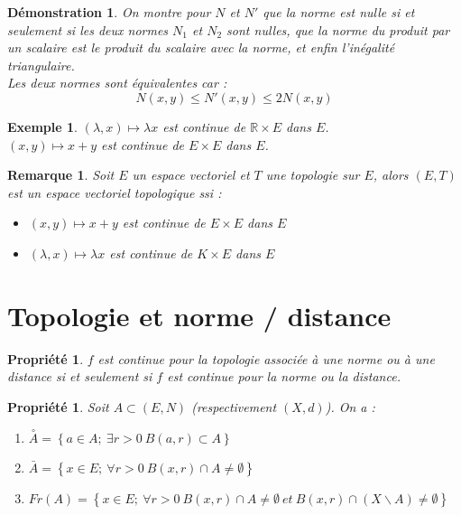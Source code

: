 \documentclass[a4paper, oneside]{report}
\theoremstyle{break}
\newtheorem{propr}[thm]{Propriété}
\newtheorem{exem}[thm]{Exemple}
\newtheorem*{demo}{Démonstration}
\newtheorem{remar}[thm]{Remarque}
\newcommand{\x}{\times}
\newcommand{\R}{\mathbb{R}}
\newcommand{\ev}{espace vectoriel }
\newcommand{\cerc}[1]{\overset{\circ}{#1}}
\begin{document}
\begin{demo}
On montre pour $N$ et $N'$ que la norme est nulle si et seulement si les deux normes $N_1$ et $N_2$ sont nulles, que la norme du produit par un scalaire est le produit du scalaire avec la norme, et enfin l'inégalité triangulaire.\\
Les deux normes sont équivalentes car :
$$N(x,y) \leq N'(x,y) \leq 2N(x,y)$$
\end{demo}



\begin{exem}
$(\lambda , x)\mapsto \lambda x$ est continue de $\R \x E$ dans $E$.\\
$(x , y)\mapsto x+y$ est continue de $E \x E$ dans $E$.\\
\end{exem}


\begin{remar}
Soit $E$ un \ev et $T$ une topologie sur $E$, alors $(E,T)$ est un \ev topologique ssi :
\begin{itemize}
\item $(x,y) \mapsto x+y$ est continue de $E\x E$ dans $E$
\item $(\lambda , x) \mapsto \lambda x$ est continue de $K\x E$ dans $E$
\end{itemize}
\end{remar}


\section{Topologie et norme / distance}

\begin{propr}
$f$ est continue pour la topologie associée à une norme ou à une distance si et seulement si $f$ est continue pour la norme ou la distance.
\end{propr}


\begin{propr}
Soit $A \subset (E,N)$ (respectivement $(X,d)$). On a :
\begin{enumerate}
\item $\cerc{A} = \left\{a \in A;~\exists r >0~B(a,r)\subset A \right\}$
\item $\bar{A} = \left\{x\in E;~\forall r>0~ B(x,r) \cap A \neq \emptyset \right\}$
\item $Fr(A)=\left\{x\in E;~ \forall r>0~ B(x,r)\cap A\neq \emptyset~et~ B(x,r)\cap (X\backslash A)\neq \emptyset \right\}$
\end{enumerate}
\end{propr}
\end{document}
